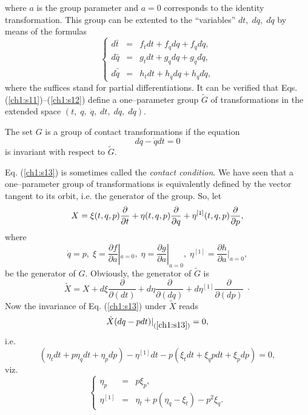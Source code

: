where $a$ is the group parameter and  $a=0$ corresponds to the identity
transformation. This group can be extented to the
``variables'' $dt,\; dq,\;d\dot q$ by means of the formulas
\begin{equation}
\label{ch1:s12}
\left \{ \begin{array}{lll}
d\bar t & = & f_tdt+f_qdq+f_{\dot q} d\dot q,\\
d\bar q & = & g_tdt+g_qdq+g_{\dot q} d\dot q,\\
d\bar{\dot q} &= & h_tdt+h_qdq+h_{\dot q} d\dot q,
\end{array}
\right.
\end{equation}
where the suffices stand for partial differentiations.
It can be verified that
Eqs. (\ref{ch1:s11})--(\ref{ch1:s12}) define a one--parameter group
$\tilde G $ of transformations  in the extended space
$(t,\;q,\;\dot q,\;dt,\;dq,\;d\dot q)$.
\begin{defi}
\begin{em}
The set $G$ is a group  of contact transformations if the equation
\begin{equation}
\label{ch1:s13}
dq-\dot q dt =0
\end{equation}
is invariant with respect to $\tilde G$.
\end{em}
\end{defi}
Eq. (\ref{ch1:s13}) is sometimes called the {\em contact condition}.
We have seen that a one--parameter group of transformations is equivalently
defined by the vector tangent to its orbit, i.e. the generator of the group.
So, let
\begin{equation}
\label{ch1:s14}
X=\xi (t,q,p)\frac{\partial}{\partial t}+\eta (t,q,p)\frac{\partial}{\partial q }+\eta^{[1]} (t,q,p)\frac{\partial}{\partial p },
\end{equation}
where
\[\dot q=p,\;\xi=\frac{\partial f}{\partial a}|_{a=0}
,\; \eta=\frac{\partial g}{\partial a}|_{a=0},
\;\eta^{[1]}=\frac{\partial h}{\partial a}|_{a=0}, \]
be the generator of $G$. Obviously, the generator of $\tilde G$ is
\begin{equation}
\label{ch1:s15}
\tilde X= X+d\xi \frac{\partial}{\partial (dt)}+
            d\eta \frac{\partial}{\partial (dq)}+
           d\eta^{[1]} \frac{\partial}{\partial (dp )}\; \cdot
\end{equation}
Now the invariance of Eq. (\ref{ch1:s13}) under $\tilde X$ reads
\[ \tilde X (dq-pdt)|_{(\ref{ch1:s13})}=0,\]
i.e.
\[(\eta_t dt+p\eta_qdt+\eta_pdp)-\eta^{[1]} dt-p(\xi_tdt+\xi_q pdt+\xi_pdp)=0,\]
viz.
\begin{equation}
\label{ch1:s16}
\left \{ \begin{array}{lll}
\eta_p &= & p\xi_p,\\
\eta^{[1]} & = & \eta_t+p(\eta_q-\xi_t)-p^2\xi_q.
\end{array}
\right.
\end{equation}
